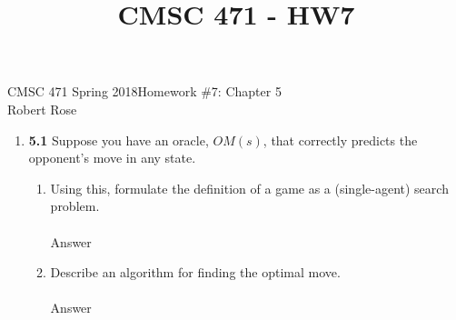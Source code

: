 \documentclass[12pt]{article}
\title{CMSC 471 - HW7}
\begin{document}
CMSC 471 Spring 2018\hfill Homework \#7: Chapter 5\\
Robert Rose

\hrulefill
\begin{enumerate}
\item \textbf{5.1} Suppose you have an oracle, $OM(s)$, that correctly predicts the opponent's move
in any state.
  \begin{enumerate}
  \item Using this, formulate the definition of a game as a (single-agent) search problem.
  \vspace{-2.5em}
  \paragraph{} Answer\\
  \item Describe an algorithm for finding the optimal move.\\
  \vspace{-2.5em}
  \paragraph{} Answer\\
  \end{enumerate}
\newpage

\end{enumerate}
\end{document}

